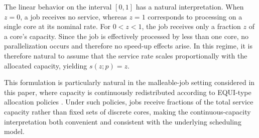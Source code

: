 \documentclass[11pt]{article}
\newcommand{\jpblue}[1]{{\color{blue} #1}}
\theoremstyle{remark}
\theoremstyle{definition}
\numberwithin{equation}{section}
\begin{document}
The linear behavior on the interval $[0,1]$ has a natural interpretation. When $z=0$, a job receives no service, whereas $z=1$ corresponds to processing on a single core at its nominal rate. For $0<z<1$, the job receives only a fraction $z$ of a core's capacity. Since the job is effectively processed by less than one core, no parallelization occurs and therefore no speed-up effects arise. In this regime, it is therefore natural to assume that the service rate scales proportionally with the allocated capacity, yielding $s(z;p)=z$.



This formulation is particularly natural in the malleable-job setting considered in this paper, where capacity is continuously redistributed according to EQUI-type allocation policies \cite{berg2017}. Under such policies, jobs receive fractions of the total service capacity rather than fixed sets of discrete cores, making the continuous-capacity interpretation both convenient and consistent with the underlying scheduling model.



\end{document}

